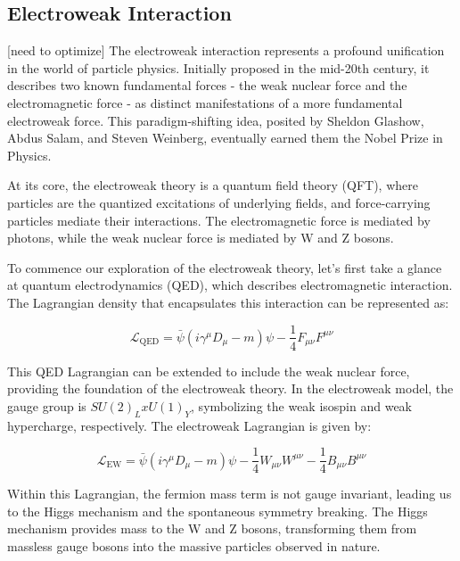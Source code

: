 \subsection{Electroweak Interaction}

[need to optimize]
The electroweak interaction represents a profound unification in the world of particle physics. Initially proposed in the mid-20th century, it describes two known fundamental forces - the weak nuclear force and the electromagnetic force - as distinct manifestations of a more fundamental electroweak force. This paradigm-shifting idea, posited by Sheldon Glashow, Abdus Salam, and Steven Weinberg, eventually earned them the Nobel Prize in Physics.

At its core, the electroweak theory is a quantum field theory (QFT), where particles are the quantized excitations of underlying fields, and force-carrying particles mediate their interactions. The electromagnetic force is mediated by photons, while the weak nuclear force is mediated by W and Z bosons.

To commence our exploration of the electroweak theory, let's first take a glance at quantum electrodynamics (QED), which describes electromagnetic interaction. The Lagrangian density that encapsulates this interaction can be represented as:

\begin{equation}
\mathcal{L}_{\text{QED}} = \bar{\psi} (i\gamma ^\mu D _\mu - m)\psi - \frac{1}{4} F _{\mu \nu} F ^{\mu \nu}
\end{equation}

This QED Lagrangian can be extended to include the weak nuclear force, providing the foundation of the electroweak theory. In the electroweak model, the gauge group is $SU(2)_L x U(1)_Y$, symbolizing the weak isospin and weak hypercharge, respectively. The electroweak Lagrangian is given by:

\begin{equation}
\mathcal{L}_{\text{EW}} = \bar{\psi} (i\gamma ^\mu D _\mu - m)\psi - \frac{1}{4} W _{\mu \nu} W ^{\mu \nu} - \frac{1}{4} B _{\mu \nu} B ^{\mu \nu}
\end{equation}

Within this Lagrangian, the fermion mass term is not gauge invariant, leading us to the Higgs mechanism and the spontaneous symmetry breaking. The Higgs mechanism provides mass to the W and Z bosons, transforming them from massless gauge bosons into the massive particles observed in nature. 

